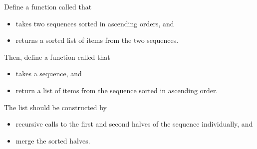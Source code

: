 \documentclass[letterpaper,10pt,english]{sphinxmanual}
\begin{document}
Define a function called  that
\begin{itemize}
\item {} 
takes two sequences sorted in ascending orders, and

\item {} 
returns a sorted list of items from the two sequences.

\end{itemize}

Then, define a function called  that
\begin{itemize}
\item {} 
takes a sequence, and

\item {} 
return a list of items from the sequence sorted in ascending order.

\end{itemize}

The list should be constructed by
\begin{itemize}
\item {} 
recursive calls to  the first and second halves of the sequence individually, and

\item {} 
merge the sorted halves.

\end{itemize}

\begin{sphinxVerbatim}[commandchars=\\\{\}]
 
       
         \PYG{p}{[}\PYG{p}{]}  \PYG{p}{[}\PYG{p}{]}     
         \PYG{p}{[}\PYG{p}{]}  \PYG{p}{[}\PYG{p}{[}\PYG{p}{]}\PYG{p}{]}
       
\end{sphinxVerbatim}
\end{document}

